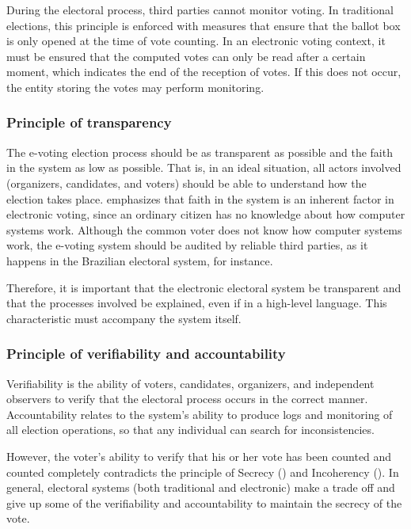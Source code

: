 \documentclass[english]{textolivre}
\begin{document}
During the electoral process, third parties cannot monitor voting. In traditional elections, this principle is enforced with measures that ensure that the ballot box is only opened at the time of vote counting. In an electronic voting context, it must be ensured that the computed votes can only be read after a certain moment, which indicates the end of the reception of votes. If this does not occur, the entity storing the votes may perform monitoring.

\subsubsection{Principle of transparency \label{sec-Transparency}}

The e-voting election process should be as transparent as possible and the faith in the system as low as possible. That is, in an ideal situation, all actors involved (organizers, candidates, and voters) should be able to understand how the election takes place. \textcite{Gritzalis} emphasizes that faith in the system is an inherent factor in electronic voting, since an ordinary citizen has no knowledge about how computer systems work. Although the common voter does not know how computer systems work, the e-voting system should be audited by reliable third parties, as it happens in the Brazilian electoral system, for instance.

Therefore, it is important that the electronic electoral system be transparent and that the processes involved be explained, even if in a high-level language. This characteristic must accompany the system itself.

\subsubsection{Principle of verifiability and accountability \label{sec-Accountability}}

Verifiability is the ability of voters, candidates, organizers, and independent observers to verify that the electoral process occurs in the correct manner. Accountability relates to the system's ability to produce logs and monitoring of all election operations, so that any individual can search for inconsistencies.

However, the voter's ability to verify that his or her vote has been counted and counted completely contradicts the principle of Secrecy () and Incoherency (). In general, electoral systems (both traditional and electronic) make a trade off and give up some of the verifiability and accountability to maintain the secrecy of the vote.
\end{document}
